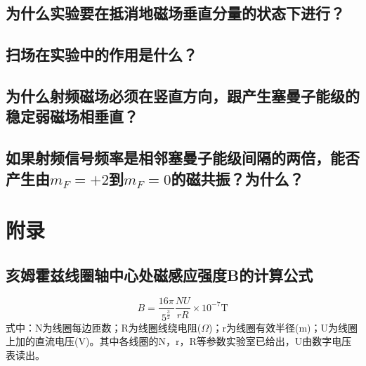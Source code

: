 \documentclass[a4paper]{article}
\begin{document}
\subsection{为什么实验要在抵消地磁场垂直分量的状态下进行？}
\subsection{扫场在实验中的作用是什么？}
\subsection{为什么射频磁场必须在竖直方向，跟产生塞曼子能级的稳定弱磁场相垂直？}
\subsection{如果射频信号频率是相邻塞曼子能级间隔的两倍，能否产生由$m_F = +2$到$m_F = 0$的磁共振？为什么？}


\section*{附录}

\begin{appendix}
\section{亥姆霍兹线圈轴中心处磁感应强度B的计算公式}
\begin{equation}
B = \frac{16\pi}{5^{\frac{3}{2}}}\frac{NU}{rR}\times 10^{-7}\text{T}\label{eq9}
\end{equation}
式中：N为线圈每边匝数；R为线圈线绕电阻($\Omega$)；r为线圈有效半径(m)；U为线圈上加的直流电压(V)。其中各线圈的N，r，R等参数实验室已给出，U由数字电压表读出。
\end{appendix}

\nocite{jiaocai}

\end{document}
